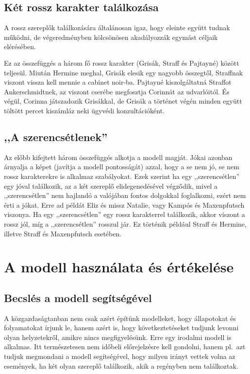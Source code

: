 \documentclass{thesis-ekf}
\begin{document}
    \section{Két rossz karakter találkozása}

    A rossz szereplők találkozására általánosan igaz, hogy eleinte együtt tudnak működni,
        de végeredményben kölcsönösen akadályozzák egymást céljaik elérésében.

    Ez az összefüggés a három fő rossz karakter (Grisák, Straff és Pajtayné) között teljesül.
    Miután Hermine meghal, Grisák elesik egy nagyobb összegtől, Straffnak viszont vissza kell mennie a cabinet noir-ba.
    Pajtayné kiszolgáltatná Straffot Ankerschmidtnek, az viszont cserébe megfosztja Corinnát az udvarlóitól.
    És végül, Corinna játszadozik Grisákkal, de Grisák a történet végén minden együtt töltött percet
        kiszámláz neki ügyvédi konzultációként.

    \section{,,A szerencsétlenek''}\label{sec_a-szerencsetlenek''}

    Az előbb kifejtett három összefüggés alkotja a modell magját.
    Jókai azonban árnyalja a képet (javítja a modell pontosságát) azzal, hogy a se nem jó, se nem rossz karakterekre is
        alkalmaz szabályokat.
    Ezek szerint ha egy ,,szerencsétlen'' egy jóval találkozik, az a két szereplő elidegenedésével végződik,
    mivel a ,,szerencsétlen'' nem hajlandó a valójában fontos dolgokkal foglalkozni, ezért nem érti a jókat.
    Erre ad példát Eliz és missz Natalie, vagy Kampós és Maxenpfutsch viszonya.
    Ha egy ,,szerencsétlen'' egy rossz karakterrel találkozik, akkor viszont a rossz jól,
        míg a ,,szerencsétlen'' rosszul jár.
    Ez történik például Straff és Hermine, illetve Straff és Maxenpfutsch esetében.

    \chapter{A modell használata és értékelése}

    \section{Becslés a modell segítségével}

    A közgazdaságtanban nem csak azért építünk modelleket, hogy állapotokat és folyamatokat írjunk le, hanem azért is,
        hogy következtetéseket tudjunk levonni olyan helyzetekről, amikre nincs megfigyelésünk.
    Erre egy irodalmi modell is alkalmas.
    Itt természetesen nem időbeli előrejelzésre kell gondolni, hanem pl.~azt tudjuk megmondani a modell segítségével,
        hogy milyen irányt vettek volna az események, ha két olyan szereplő találkozik, akik a regényben nem találkoztak.
\end{document}
